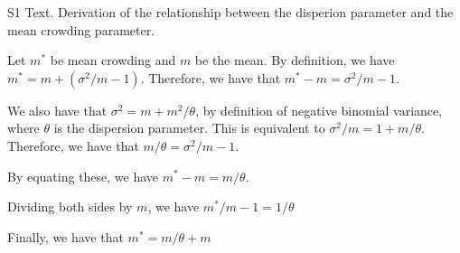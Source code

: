 S1 Text. Derivation of the relationship between the disperion parameter and the mean crowding parameter. 

Let $m^*$ be mean crowding and $m$ be the mean. By definition, we have $m^* = m +(\sigma^2/m -1)$. 
Therefore, we have that $m^*- m = \sigma^2/m -1$.

We also have that $\sigma^2 = m + m^2/\theta$, by definition of negative binomial variance, where $\theta$ is the dispersion parameter. This is equivalent to $\sigma^2/m = 1 + m/\theta$.
Therefore, we have that $m/\theta = \sigma^2/m - 1$.

By equating these, we have $m^*- m = m/\theta$. 

Dividing both sides by $m$, we have $m^*/m - 1 = 1/\theta$

Finally, we have that $m^*= m/\theta + m$
